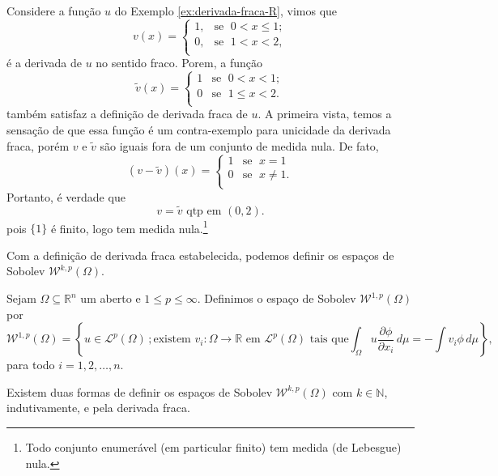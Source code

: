 \documentclass[a4paper, 11pt]{book}
\theoremstyle{definition}
\newcommand{\bN}{\mathbb{N}}
\newcommand{\bR}{\mathbb{R}}
\newcommand{\cL}{\mathcal{L}}
\newcommand{\cW}{\mathcal{W}}
\begin{document}
\begin{ex}
    Considere a função $u$ do Exemplo \ref{ex:derivada-fraca-R}, vimos que
    \[
        v(x) = \left\{
            \begin{array}{rl}
                1, & \!\text{se }\; 0 < x \leqslant 1;\\
                0, & \!\text{se }\; 1 < x < 2,\\
            \end{array}
        \right.
    \]
    é a derivada de $u$ no sentido fraco.
    Porem, a função
    \[
        \tilde v(x) = \left\{
            \begin{array}{rl}
                1 & \text{se }\; 0 < x < 1;\\
                0 & \text{se }\; 1 \leqslant x < 2.\\
            \end{array}
        \right.
    \]
    também satisfaz a definição de derivada fraca de $u$.
    A primeira vista, temos a sensação de que essa função é um contra-exemplo para unicidade da derivada fraca, porém $v$ e $\tilde v$ são iguais fora de um conjunto de medida nula.
    De fato,
    \[
        (v - \tilde v)(x) = \left\{
            \begin{array}{rl}
                1 & \text{se }\; x = 1\\
                0 & \text{se }\; x \neq 1.\\
            \end{array}
        \right.
    \]
    Portanto, é verdade que
    \[
        v = \tilde v \text{ qtp em } (0,2).
    \]
    pois $\{1\}$ é finito, logo tem medida nula.\footnote{Todo conjunto enumerável (em particular finito) tem medida (de Lebesgue) nula.}
\end{ex}

Com a definição de derivada fraca estabelecida, podemos definir os espaços de Sobolev $\cW^{k,p}(\Omega)$.

\begin{dbox}
    Sejam $\Omega \subseteq \bR^n$ um aberto e $1 \leqslant p \leqslant \infty$. 
    Definimos o espaço de Sobolev $\cW^{1,p}(\Omega)$ por
    \[
        \cW^{1,p}(\Omega) = \left\{u \in \cL^p(\Omega) \,; \text{existem } v_i : \Omega \to \bR \text{ em $\cL^p(\Omega)$ tais que} \int_\Omega u \dfrac{\partial \phi}{\partial x_i} \, d\mu = -\!\!\int v_i \phi \,d\mu \right\},
    \]
    para todo $i = 1,2,\dots,n$.
\end{dbox}

Existem duas formas de definir os espaços de Sobolev $\cW^{k,p}(\Omega)$ com $k \in \bN$, indutivamente, e pela derivada fraca.
\end{document}
